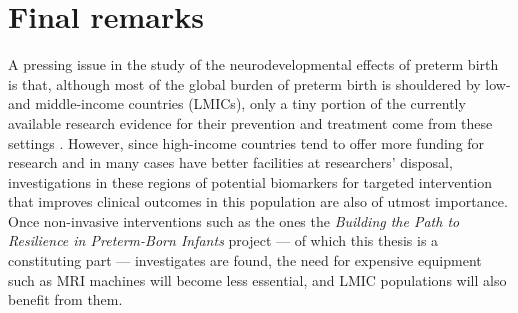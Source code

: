 \section{Final remarks}

A pressing issue in the study of the neurodevelopmental effects of preterm birth is that, although most of the global burden of preterm birth is shouldered by low- and middle-income countries (LMICs), only a tiny portion of the currently available research evidence for their prevention and treatment come from these settings \citep{Smid2016}. However, since high-income countries tend to offer more funding for research and in many cases have better facilities at researchers' disposal, investigations in these regions of potential biomarkers for targeted intervention that improves clinical outcomes in this population are also of utmost importance. Once non-invasive interventions such as the ones the \textit{Building the Path to Resilience in Preterm-Born Infants} project --- of which this thesis is a constituting part --- investigates are found, the need for expensive equipment such as MRI machines will become less essential, and LMIC populations will also benefit from them.  
